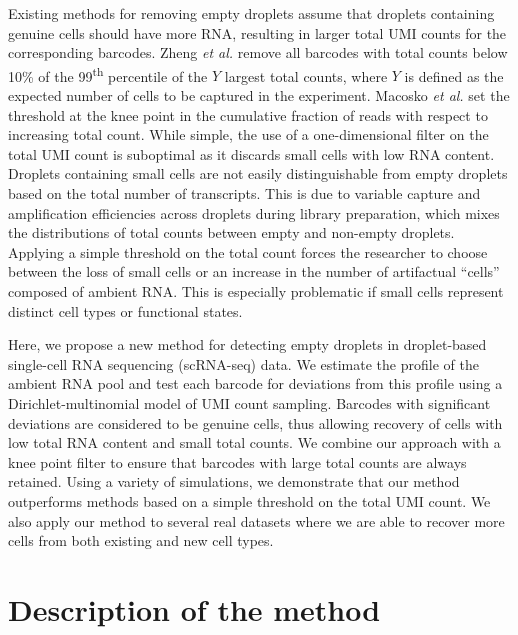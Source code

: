 \documentclass[10pt,letterpaper]{article}
\begin{document}
Existing methods for removing empty droplets assume that droplets containing genuine cells should have more RNA, resulting in larger total UMI counts for the corresponding barcodes.
Zheng \textit{et al.} \cite{zheng2017massively} remove all barcodes with total counts below 10\% of the 99\textsuperscript{th} percentile of the $Y$ largest total counts, where $Y$ is defined as the expected number of cells to be captured in the experiment.
Macosko \textit{et al.} \cite{macosko2015highly} set the threshold at the knee point in the cumulative fraction of reads with respect to increasing total count.
While simple, the use of a one-dimensional filter on the total UMI count is suboptimal as it discards small cells with low RNA content.
Droplets containing small cells are not easily distinguishable from empty droplets based on the total number of transcripts.
This is due to variable capture and amplification efficiencies across droplets during library preparation, which mixes the distributions of total counts between empty and non-empty droplets.
Applying a simple threshold on the total count forces the researcher to choose between the loss of small cells or an increase in the number of artifactual ``cells'' composed of ambient RNA.
This is especially problematic if small cells represent distinct cell types or functional states.

Here, we propose a new method for detecting empty droplets in droplet-based single-cell RNA sequencing (scRNA-seq) data.
We estimate the profile of the ambient RNA pool and test each barcode for deviations from this profile using a Dirichlet-multinomial model of UMI count sampling.
Barcodes with significant deviations are considered to be genuine cells, thus allowing recovery of cells with low total RNA content and small total counts.
We combine our approach with a knee point filter to ensure that barcodes with large total counts are always retained.
Using a variety of simulations, we demonstrate that our method outperforms methods based on a simple threshold on the total UMI count.
We also apply our method to several real datasets where we are able to recover more cells from both existing and new cell types.

\section*{Description of the method}
\end{document}
